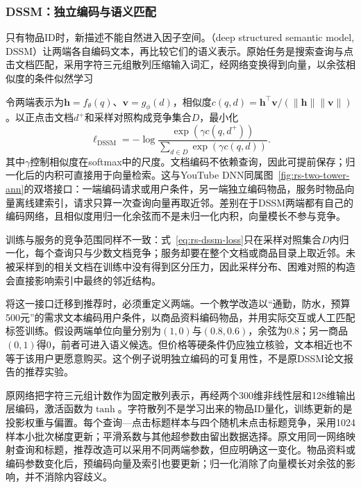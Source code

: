 \subsubsection{DSSM：独立编码与语义匹配}
\label{sec:rs-dssm}

只有物品ID时，新描述不能自然进入因子空间。（deep structured semantic model, DSSM）让两端各自编码文本，再比较它们的语义表示。原始任务是搜索查询与点击文档匹配，采用字符三元组散列压缩输入词汇，经网络变换得到向量，以余弦相似度的条件似然学习

令两端表示为$\bm h=f_\theta(q)$、$\bm v=g_\phi(d)$，相似度$c(q,d)=\bm h^\top\bm v/(\|\bm h\|\|\bm v\|)$。以正点击文档$d^+$和采样对照构成竞争集合$D$，最小化
\begin{equation}
 \ell_{\mathrm{DSSM}}=-\log
       \frac{\exp(\gamma c(q,d^+))}
            {\sum_{d\in D}\exp(\gamma c(q,d))}.
 \label{eq:rs-dssm-loss}
\end{equation}
其中$\gamma$控制相似度在softmax中的尺度。文档编码不依赖查询，因此可提前保存；归一化后的内积可直接用于向量检索。这与YouTube DNN同属图~\ref{fig:rs-two-tower-ann}的双塔接口：一端编码请求或用户条件，另一端独立编码物品，服务时物品向量离线建索引，请求只算一次查询向量再取近邻。差别在于DSSM两端都有自己的编码网络，且相似度用归一化余弦而不是未归一化内积，向量模长不参与竞争。

训练与服务的竞争范围同样不一致：式~\eqref{eq:rs-dssm-loss}只在采样对照集合$D$内归一化，每个查询只与少数文档竞争；服务却要在整个文档或商品目录上取近邻。未被采样到的相关文档在训练中没有得到区分压力，因此采样分布、困难对照的构造会直接影响索引中最终的邻近结构。

将这一接口迁移到推荐时，必须重定义两端。一个教学改造以“通勤，防水，预算500元”的需求文本编码用户条件，以商品资料编码物品，并用实际交互或人工匹配标签训练。假设两端单位向量分别为$(1,0)$与$(0.8,0.6)$，余弦为0.8；另一商品$(0,1)$得0，前者可进入语义候选。但价格等硬条件仍应独立核验，文本相近也不等于该用户更愿意购买。这个例子说明独立编码的可复用性，不是原DSSM论文报告的推荐实验。

原网络把字符三元组计数作为固定散列表示，再经两个300维非线性层和128维输出层编码，激活函数为$\tanh$。字符散列不是学习出来的物品ID量化，训练更新的是投影权重与偏置。每个查询—点击标题样本与四个随机未点击标题竞争，采用1024样本小批次梯度更新；平滑系数与其他超参数由留出数据选择。原文用同一网络映射查询和标题，推荐改造可以采用不同两端参数，但应明确这一变化。物品资料或编码参数变化后，预编码向量及索引也要更新；归一化消除了向量模长对余弦的影响，并不消除内容歧义。

